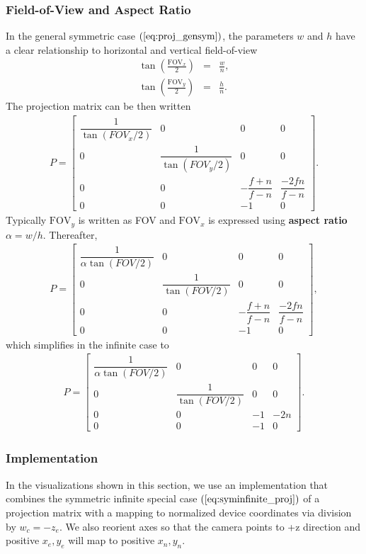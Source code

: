 \documentclass [12pt, a4paper] {article}
\begin{document}
\subsubsection{Field-of-View and Aspect Ratio}
In the general symmetric case $(\ref{eq:proj_gensym})$, the parameters 
$w$ and $h$ have a clear relationship to horizontal and vertical field-of-view
\begin {eqnarray}
    \tan\left(\frac{\textrm{FOV}_x}{2}\right) &=& \frac{w}{n}, \\
    \tan\left(\frac{\textrm{FOV}_y}{2}\right) &=& \frac{h}{n}.
\end {eqnarray}
The projection matrix can be then written 
\begin {eqnarray}
    P
    =
    \begin {bmatrix}
        \dfrac{1}{\tan(FOV_x/2)} & 0 & 0 & 0 \\
        0 & \dfrac{1}{\tan(FOV_y/2)} & 0 & 0 \\
        0 & 0 & -\dfrac{f+n}{f-n} & \dfrac{-2fn}{f-n} \\
        0 & 0 & -1 & 0
    \end {bmatrix}.
\end {eqnarray}
Typically $\textrm{FOV}_y$ is written as FOV and $\textrm{FOV}_x$ is expressed 
using \textbf{aspect ratio} $\alpha=w/h$. Thereafter,
\begin {eqnarray}
    P
    =
    \begin {bmatrix}
        \dfrac{1}{\alpha\tan(FOV/2)} & 0 & 0 & 0 \\
        0 & \dfrac{1}{\tan(FOV/2)} & 0 & 0 \\
        0 & 0 & -\dfrac{f+n}{f-n} & \dfrac{-2fn}{f-n} \\
        0 & 0 & -1 & 0
    \end {bmatrix},
\end {eqnarray}
which simplifies in the infinite case to
\begin {eqnarray}
    P
    =
    \begin {bmatrix}
        \dfrac{1}{\alpha\tan(FOV/2)} & 0 & 0 & 0 \\
        0 & \dfrac{1}{\tan(FOV/2)} & 0 & 0 \\
        0 & 0 & -1 & -2n \\
        0 & 0 & -1 & 0
    \end {bmatrix}.
\end {eqnarray}
\subsubsection{Implementation}
\lstset{numbers=left, basicstyle=\footnotesize,breaklines=true}
In the visualizations shown in this section, we use an implementation that 
combines the symmetric infinite special case $(\ref{eq:syminfinite_proj})$
of a projection matrix with a mapping to normalized device coordinates via 
division by $w_c = -z_e$. We also reorient axes so that the camera points 
to +z direction and positive $x_e, y_e$ will map to positive $x_n, y_n$.
\end{document}
